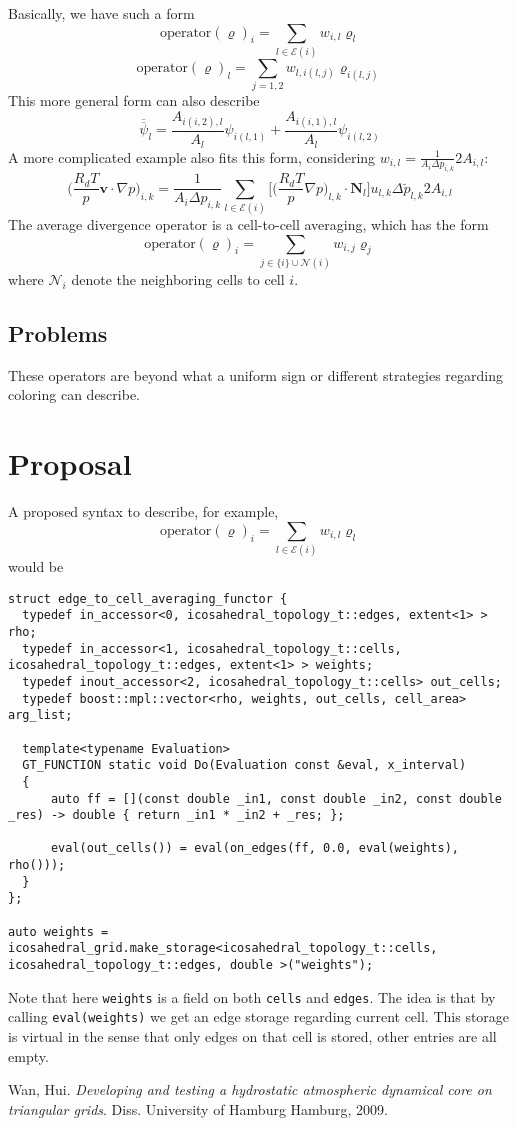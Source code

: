 \documentclass[12pt]{article}
\begin{document}
  Basically, we have such a form
  \[\text{operator}(\varrho)_i = \sum\limits_{l \in \mathcal{E}(i)}w_{i, l}\varrho_{l}\]
  \[\text{operator}(\varrho)_l = \sum\limits_{j=1,2}w_{l, i(l,j)}\varrho_{i(l,j)}\]
  This more general form can also describe
  \begin{equation}
    \overline{\overline\psi}_l = \frac{A_{i(i,2),l}}{A_l}\psi_{i(l,1)} + \frac{A_{i(i,1),l}}{A_l}\psi_{i(l,2)}
    \tag{3.51}
  \end{equation}
  A more complicated example also fits this form, considering $w_{i, l}=\frac{1}{A_i \Delta p_{i, k}}2A_{i,l}$:
  \begin{equation}
      \Big(\frac{R_dT}{p}\bm{v}\cdot\nabla p\Big)_{i, k} = \frac{1}{A_i \Delta p_{i, k}} \sum\limits_{l\in\mathcal{E}(i)}\bigg[\Big(\frac{R_dT}{p}\nabla p\Big)_{l, k}\cdot \bm{N}_l\bigg] u_{l,k} \Delta\breve{p}_{l,k}2A_{i,l}
      \tag{3.57}
    \end{equation}
  The average divergence operator is a cell-to-cell averaging, which has the form
  \[\text{operator}(\varrho)_i = \sum\limits_{j \in \{i\}\cup\mathcal{N}(i)}w_{i, j}\varrho_{j}\]
  where $\mathcal{N}_i$ denote the neighboring cells to cell $i$.

  \subsection{Problems}
  These operators are beyond what a uniform sign or different strategies regarding coloring can describe.

  \section{Proposal}
  A proposed syntax to describe, for example,
  \[\text{operator}(\varrho)_i = \sum\limits_{l \in \mathcal{E}(i)}w_{i, l}\varrho_{l}\]
  would be
  \begin{lstlisting}[frame=single]
struct edge_to_cell_averaging_functor {
  typedef in_accessor<0, icosahedral_topology_t::edges, extent<1> > rho;
  typedef in_accessor<1, icosahedral_topology_t::cells, icosahedral_topology_t::edges, extent<1> > weights;
  typedef inout_accessor<2, icosahedral_topology_t::cells> out_cells;
  typedef boost::mpl::vector<rho, weights, out_cells, cell_area> arg_list;

  template<typename Evaluation>
  GT_FUNCTION static void Do(Evaluation const &eval, x_interval)
  {
      auto ff = [](const double _in1, const double _in2, const double _res) -> double { return _in1 * _in2 + _res; };

      eval(out_cells()) = eval(on_edges(ff, 0.0, eval(weights), rho()));
  }
};

auto weights = icosahedral_grid.make_storage<icosahedral_topology_t::cells, icosahedral_topology_t::edges, double >("weights");
  \end{lstlisting}
Note that here \texttt{weights} is a field on both \texttt{cells} and \texttt{edges}. The idea is that by calling \texttt{eval(weights)} we get an edge storage regarding current cell. This storage is virtual in the sense that only edges on that cell is stored, other entries are all empty.



  \begin{thebibliography}{9}
  Wan, Hui. \textit{Developing and testing a hydrostatic atmospheric dynamical core on triangular grids}. Diss. University of Hamburg Hamburg, 2009.
  \end{thebibliography}
\end{document}
